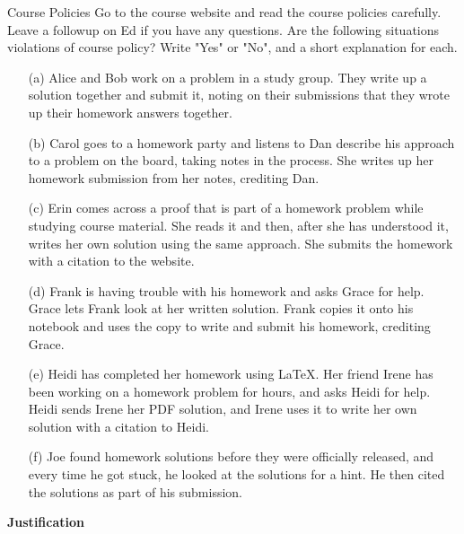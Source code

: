\begin{homeworkProblem}{Course Policies}
    Go to the course website and read the course policies carefully. Leave 
    a followup on Ed if you have any questions. Are the following 
    situations violations of course policy? Write "Yes" or "No", and a 
    short explanation for each.

    \begin{itemize}
        \item[(a)] Alice and Bob work on a problem in a study group. They 
        write up a solution together and submit it, noting on their 
        submissions that they wrote up their homework answers together.
        \item[(b)] Carol goes to a homework party and listens to Dan 
        describe his approach to a problem on the board, taking notes in 
        the process. She writes up her homework submission from her notes, 
        crediting Dan.
        \item[(c)] Erin comes across a proof that is part of a homework 
        problem while studying course material. She reads it and then, 
        after she has understood it, writes her own solution using the same 
        approach. She submits the homework with a citation to the website. 
        \item[(d)] Frank is having trouble with his homework and asks Grace 
        for help. Grace lets Frank look at her written solution. Frank 
        copies it onto his notebook and uses the copy to write and submit 
        his homework, crediting Grace. 
        \item[(e)] Heidi has completed her homework using \LaTeX. Her 
        friend Irene has been working on a homework problem for hours, and 
        asks Heidi for help. Heidi sends Irene her PDF solution, and Irene 
        uses it to write her own solution with a citation to Heidi.
        \item[(f)] Joe found homework solutions before they were officially 
        released, and every time he got stuck, he looked at the solutions 
        for a hint. He then cited the solutions as part of his submission.
    \end{itemize}

    \textbf{Justification}
    \\


\end{homeworkProblem}
